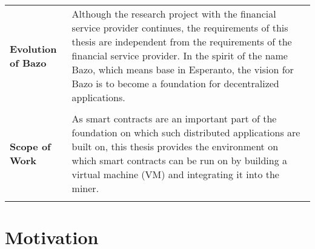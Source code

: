 \begin{tabular}[t]{ p{3cm} p{12.5cm}}
\raggedright
\textbf{Evolution of Bazo} & 
Although the research project with the financial service provider continues, the requirements of this thesis are independent from the requirements of the financial service provider. In the spirit of the name Bazo, which means base in Esperanto, the vision for Bazo is to become a foundation for decentralized applications. \\ \\

\raggedright
\textbf{Scope of Work} & 
As smart contracts are an important part of the foundation on which such distributed applications are built on, this thesis provides the environment on which smart contracts can be run on by building a virtual machine (VM) and integrating it into the miner. \\ \\
\end{tabular}
\pagebreak

\section{Motivation}


